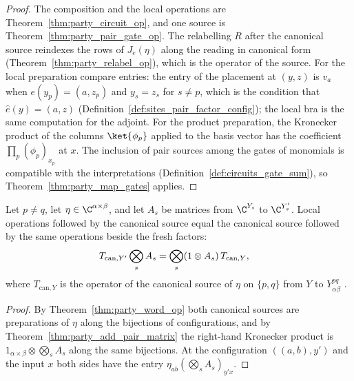 \begin{proof}\leanok
    The composition and the local operations are Theorem~\ref{thm:party_circuit_op},
    and one source is Theorem~\ref{thm:party_pair_gate_op}. The relabelling $R$ after
    the canonical source reindexes the rows of $J_e(\eta)$ along the reading in
    canonical form (Theorem~\ref{thm:party_relabel_op}), which is the operator of the
    source. For the local preparation compare entries: the entry of the placement at
    $(y,z)$ is $v_a$ when $e(y_p)=(a,z_p)$ and $y_s=z_s$ for $s\neq p$, which is the
    condition that $\hat e(y)=(a,z)$ (Definition~\ref{def:sites_pair_factor_config});
    the local bra is the same computation for the adjoint. For the product
    preparation, the Kronecker product of the columns $\ket{\phi_p}$ applied to the
    basis vector has the coefficient $\prod_p(\phi_p)_{x_p}$ at $x$. The inclusion of
    pair sources among the gates of monomials is compatible with the interpretations
    (Definition~\ref{def:circuits_gate_sum}), so Theorem~\ref{thm:party_map_gates}
    applies.
\end{proof}

\begin{theorem}
    \label{thm:party_source_commutes}
    \leanok
    Let $p\neq q$, let $\eta\in\C^{\alpha\times\beta}$, and let $A_s$ be matrices from
    $\C^{Y_s}$ to $\C^{Y'_s}$. Local operations followed by the canonical source equal
    the canonical source followed by the same operations beside the fresh factors:
    \begin{align}
        T_{\mathrm{can},Y'}\bigotimes_sA_s & =\bigotimes_s(1\otimes A_s)\,T_{\mathrm{can},Y},
        \notag
    \end{align}
    where $T_{\mathrm{can},Y}$ is the operator of the canonical source of $\eta$ on
    $\{p,q\}$ from $Y$ to $Y^{pq}_{\alpha\beta}$
    \cite[Theorem~5.2]{OpenAI2026PolynomialPEPS}.
\end{theorem}
\begin{proof}\leanok
    By Theorem~\ref{thm:party_word_op} both canonical sources are preparations of
    $\eta$ along the bijections of configurations, and by
    Theorem~\ref{thm:party_add_pair_matrix} the right-hand Kronecker product is
    $1_{\alpha\times\beta}\otimes\bigotimes_sA_s$ along the same bijections. At the
    configuration $((a,b),y')$ and the input $x$ both sides have the entry
    $\eta_{ab}(\bigotimes_sA_s)_{y'x}$.
\end{proof}

